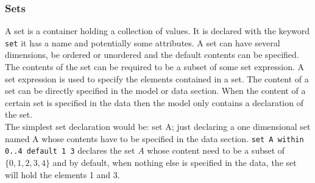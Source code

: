 \subsubsection{Sets}
A set is a container holding a collection of values. It is declared with the keyword \verb=set= it has a name and potentially some attributes. A set can have several dimensions, be ordered or unordered and the default contents can be specified. The contents of the set can be required to be a subset of some set expression. A set expression is used to specify the elements contained in a set. The content of a set can be directly specified in the model or data section. When the content of a certain set is specified in the data then the model only contains a declaration of the set.\\
The simplest set declaration would be: set A; just declaring a one dimensional set named A whose contents have to be specified in the data section. 
\verb&set A within 0..4 default 1 3& declares the set $A$ whose content need to be a subset of $\lbrace 0,1,2,3,4\rbrace$ and by default, when nothing else is specified in the data, the set will hold the elements 1 and 3.

